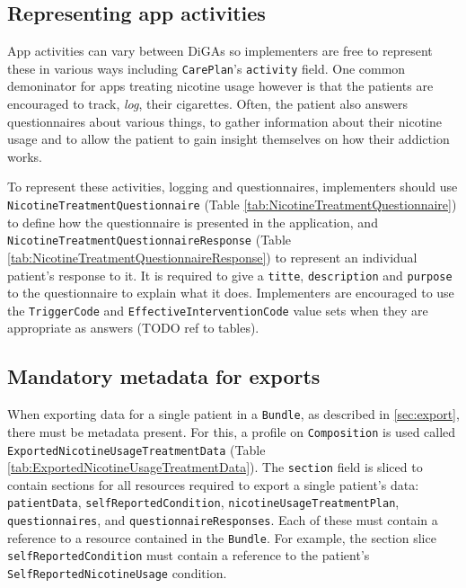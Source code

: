 \documentclass[12px]{report}
\def\code#1{\texttt{#1}} %
\newcommand{\tabquestionnaire}{}
\newcommand{\tabresponse}{}
\newcommand{\tabcomposition}{}
\begin{document}
\subsection{Representing app activities}
\tabquestionnaire
\tabresponse
App activities can vary between DiGAs so implementers are free to represent these in various ways including \code{CarePlan}'s \code{activity} field. 
One common demoninator for apps treating nicotine usage however is that the patients are encouraged to track, \textit{log}, their cigarettes. 
Often, the patient also answers questionnaires about various things, to gather information about their nicotine usage and to allow the patient to gain insight themselves on how their addiction works.

To represent these activities, logging and questionnaires, implementers should use \code{NicotineTreatmentQuestionnaire} (Table \ref{tab:NicotineTreatmentQuestionnaire}) to define how the questionnaire is presented in the application, 
and \code{NicotineTreatmentQuestionnaireResponse} (Table \ref{tab:NicotineTreatmentQuestionnaireResponse}) to represent an individual patient's response to it. It is required to give a \code{titte}, \code{description} and \code{purpose} to the questionnaire to explain what it does.
Implementers are encouraged to use the \code{TriggerCode} and \code{EffectiveInterventionCode} value sets when they are appropriate as answers (TODO ref to tables).

\subsection{Mandatory metadata for exports}
\label{sec:comp}
\tabcomposition
When exporting data for a single patient in a \code{Bundle}, as described in \ref{sec:export}, there must be metadata present. 
For this, a profile on \code{Composition} is used called \code{ExportedNicotineUsageTreatmentData} (Table \ref{tab:ExportedNicotineUsageTreatmentData}).
The \code{section} field is sliced to contain sections for all resources required to export a single patient's data: 
\code{patientData}, \code{selfReportedCondition}, \code{nicotineUsageTreatmentPlan}, \code{questionnaires}, and \code{questionnaireResponses}.
Each of these must contain a reference to a resource contained in the \code{Bundle}. For example, the section slice \code{selfReportedCondition} must
contain a reference to the patient's \code{SelfReportedNicotineUsage} condition.

\printbibliography[heading=bibintoc, title={References}]
\end{document}
